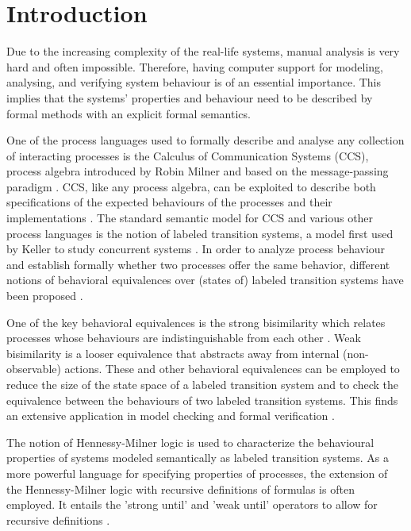 \section{Introduction}

Due to the increasing complexity of the real-life systems, manual analysis is very hard and often impossible. Therefore, having computer support for modeling, analysing, and verifying system behaviour is of an essential importance. This implies that the systems' properties and behaviour need to be described by formal methods with an explicit formal semantics.

One of the process languages used to formally describe and analyse any collection of interacting processes is the Calculus of Communication Systems (CCS), process algebra introduced by Robin Milner and based on the message-passing paradigm \cite{Milner1}\cite{Milner2}. CCS, like any process algebra, can be exploited to describe both specifications of the expected behaviours of the processes and their implementations \cite{HandbookProcessAlgebra}. The standard semantic model for CCS and various other process languages is the notion of labeled transition systems, a model first used by Keller to study concurrent systems \cite{Keller}. In order to analyze process behaviour and establish formally whether two processes offer the same behavior, different notions of behavioral equivalences over (states of) labeled transition systems have been proposed \cite{ReactiveSystems}.

One of the key behavioral equivalences is the strong bisimilarity \cite{Park} which relates processes whose behaviours are indistinguishable from each other \cite{UnderstandingConcurrentSystems}. Weak bisimilarity \cite{Milner1}\cite{Milner3} is a looser equivalence that abstracts away from internal (non-observable) actions. These and other behavioral equivalences can be employed to reduce the size of the state space of a labeled transition system and to check the equivalence between the behaviours of two labeled transition systems. This finds an extensive application in model checking and formal verification \cite{ModelChecking}\cite{ReactiveSystems}.

The notion of Hennessy-Milner logic \cite{HennessyMilner} is used to characterize the behavioural properties of systems modeled semantically as labeled transition systems. As a more powerful language for specifying properties of processes, the extension of the Hennessy-Milner logic with recursive definitions of formulas \cite{Larsen} is often employed. It entails the 'strong until' and 'weak until' operators to allow for recursive definitions \cite{ReactiveSystems}.


